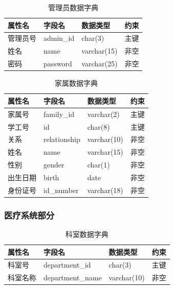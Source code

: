 \documentclass{article}
\begin{document}
\begin{table}[H]
    \centering
    \begin{tabularx}{\textwidth}{|p{2.2cm}|p{3.2cm}|p{4.8cm}|p{5cm}|}
    \toprule
    \textbf{属性名} & \textbf{字段名} & \textbf{数据类型} & \textbf{约束} \\ \midrule
    管理员号 & admin\_id & char(3) & 主键 \\ \midrule
    姓名 & name & varchar(15) & 非空 \\ \midrule
    密码 & password & varchar(25) & 非空 \\ \bottomrule
    \end{tabularx}
    \caption{管理员数据字典}
    \label{tab:admin_user}
\end{table}

\begin{table}[H]
    \centering
    \begin{tabularx}{\textwidth}{|p{2.2cm}|p{3.2cm}|p{4.8cm}|p{5cm}|}
    \toprule
    \textbf{属性名} & \textbf{字段名} & \textbf{数据类型} & \textbf{约束} \\ \midrule
    家属号 & family\_id & varchar(2) & 主键 \\ \midrule
    学工号 & id & char(8) & 主键 \\ \midrule
    关系 & relationship & varchar(10) & 非空 \\ \bottomrule
    姓名 & name & varchar(15) & 非空 \\ \midrule
    性别 & gender & char(1) & 非空 \\ \midrule
    出生日期 & birth & date & 非空 \\ \midrule
    身份证号 & id\_number & varchar(18) & 非空 \\ \bottomrule
    \end{tabularx}
    \caption{家属数据字典}
    \label{tab:family_user}
\end{table}

\subsubsection{医疗系统部分}

\begin{table}[H]
    \centering
    \begin{tabularx}{\textwidth}{|p{2.2cm}|p{3.2cm}|p{4.8cm}|p{5cm}|}
    \toprule
    \textbf{属性名} & \textbf{字段名} & \textbf{数据类型} & \textbf{约束} \\ \midrule
    科室号 & department\_id & char(3) & 主键 \\ \midrule
    科室名称 & department\_name & varchar(10) & 非空 \\ \bottomrule
    \end{tabularx}
    \caption{科室数据字典}
    \label{tab:department}
\end{table}
\end{document}
